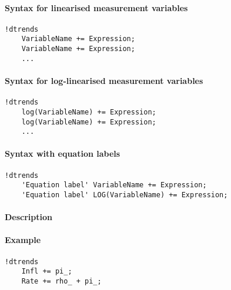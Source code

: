 


	\paragraph{Syntax for linearised measurement
variables}\label{syntax-for-linearised-measurement-variables}

\begin{verbatim}
!dtrends
    VariableName += Expression;
    VariableName += Expression;
    ...
\end{verbatim}

\paragraph{Syntax for log-linearised measurement
variables}\label{syntax-for-log-linearised-measurement-variables}

\begin{verbatim}
!dtrends
    log(VariableName) += Expression;
    log(VariableName) += Expression;
    ...
\end{verbatim}

\paragraph{Syntax with equation
labels}\label{syntax-with-equation-labels}

\begin{verbatim}
!dtrends
    'Equation label' VariableName += Expression;
    'Equation label' LOG(VariableName) += Expression;
\end{verbatim}

\paragraph{Description}\label{description}

\paragraph{Example}\label{example}

\begin{verbatim}
!dtrends
    Infl += pi_;
    Rate += rho_ + pi_;
\end{verbatim}


